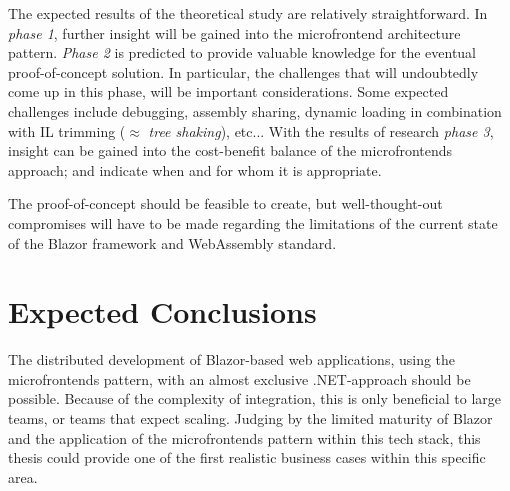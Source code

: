 The expected results of the theoretical study are relatively straightforward. In
\textit{phase 1}, further insight will be gained into the microfrontend
architecture pattern. \textit{Phase 2} is predicted to provide valuable
knowledge for the eventual proof-of-concept solution. In particular, the
challenges that will undoubtedly come up in this phase, will be important
considerations. Some expected challenges include debugging, assembly sharing,
dynamic loading in combination with IL trimming ($\approx$ \textit{tree
shaking}), etc... With the results of research \textit{phase 3}, insight can be
gained into the cost-benefit balance of the microfrontends approach; and
indicate when and for whom it is appropriate. 

The proof-of-concept should be feasible to create, but well-thought-out
compromises will have to be made regarding the limitations of the current state
of the Blazor framework and WebAssembly standard.




\section{Expected Conclusions}
\label{sec:expected-conclusions}

The distributed development of Blazor-based web applications, using the
microfrontends pattern, with an almost exclusive .NET-approach should be
possible. Because of the complexity of integration, this is only beneficial to
large teams, or teams that expect scaling. Judging by the limited maturity of
Blazor and the application of the microfrontends pattern within this tech
stack, this thesis could provide one of the first realistic business cases
within this specific area.